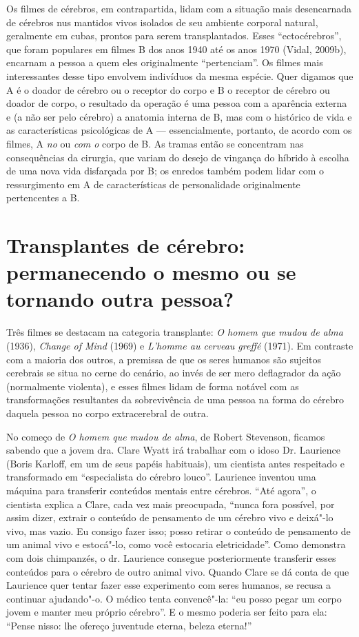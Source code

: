 Os filmes de cérebros, em contrapartida, lidam com a situação mais
desencarnada de cérebros nus mantidos vivos isolados de seu ambiente
corporal natural, geralmente em cubas, prontos para serem
transplantados. Esses ``ectocérebros'', que foram populares em filmes B
dos anos 1940 até os anos 1970 (Vidal, 2009b), encarnam a pessoa a quem
eles originalmente ``pertenciam''. Os filmes mais interessantes desse
tipo envolvem indivíduos da mesma espécie. Quer digamos que A é o doador
de cérebro ou o receptor do corpo e B o receptor de cérebro ou doador de
corpo, o resultado da operação é uma pessoa com a aparência externa e (a
não ser pelo cérebro) a anatomia interna de B, mas com o histórico de
vida e as características psicológicas de A --- essencialmente,
portanto, de acordo com os filmes, A \emph{no} ou \emph{com o} corpo de
B. As tramas então se concentram nas consequências da cirurgia, que
variam do desejo de vingança do híbrido à escolha de uma nova vida
disfarçada por B; os enredos também podem lidar com o ressurgimento em A
de características de personalidade originalmente pertencentes a B.

\section{Transplantes de cérebro: permanecendo o mesmo ou se tornando outra
pessoa?}

Três filmes se destacam na categoria transplante: \emph{O homem que
mudou de alma} (1936), \emph{Change of Mind} (1969) e \emph{L'homme au
cerveau greffé} (1971). Em contraste com a maioria dos outros, a
premissa de que os seres humanos são sujeitos cerebrais se situa no
cerne do cenário, ao invés de ser mero deflagrador da ação (normalmente
violenta), e esses filmes lidam de forma notável com as transformações
resultantes da sobrevivência de uma pessoa na forma do cérebro daquela
pessoa no corpo extracerebral de outra.

No começo de \emph{O homem que mudou de alma}, de Robert Stevenson,
ficamos sabendo que a jovem dra. Clare Wyatt irá trabalhar com o idoso
Dr. Laurience (Boris Karloff, em um de seus papéis habituais), um
cientista antes respeitado e transformado em ``especialista do cérebro
louco''. Laurience inventou uma máquina para transferir conteúdos
mentais entre cérebros. ``Até agora'', o cientista explica a Clare, cada
vez mais preocupada, ``nunca fora possível, por assim dizer, extrair o
conteúdo de pensamento de um cérebro vivo e deixá"-lo vivo, mas vazio. Eu
consigo fazer isso; posso retirar o conteúdo de pensamento de um animal
vivo e estocá"-lo, como você estocaria eletricidade''. Como demonstra com
dois chimpanzés, o dr. Laurience consegue posteriormente transferir
esses conteúdos para o cérebro de outro animal vivo. Quando Clare se dá
conta de que Laurience quer tentar fazer esse experimento com seres
humanos, se recusa a continuar ajudando"-o. O médico tenta convencê"-la:
``eu posso pegar um corpo jovem e manter meu próprio cérebro''. E o
mesmo poderia ser feito para ela: ``Pense nisso: lhe ofereço juventude
eterna, beleza eterna!''

